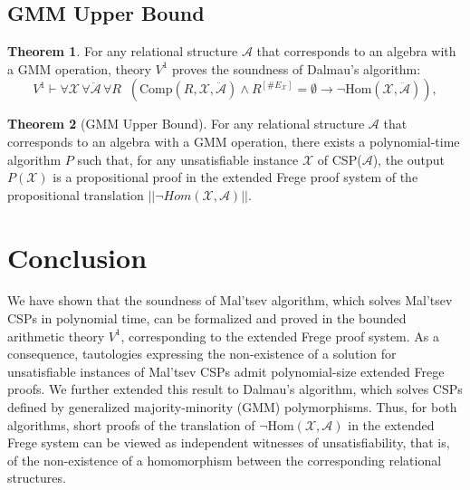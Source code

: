 \documentclass{article}
\theoremstyle{definition}
\theoremstyle{theorem}
\newtheorem{thm}{Theorem}
\theoremstyle{theorem}
\theoremstyle{remark}
\theoremstyle{remark}
\theoremstyle{example}
\theoremstyle{notation}
\theoremstyle{theorem}
\begin{document}
\subsection{GMM Upper Bound}\label{alskh;alisydf;sdd}

\begin{thm}\label{jkjkajsflageee}
For any relational structure $\mathcal{A}$ that corresponds to an algebra with a GMM operation, theory $V^1$ proves the soundness of Dalmau's algorithm:
\[
V^1 \vdash \forall \mathcal{X} \, \forall \ddot{\mathcal{A}} \, \forall R  \;\; \left( \mathrm{Comp}(R, \mathcal{X}, \ddot{\mathcal{A}}) \wedge R^{[\#E_{\mathcal{X}}]} = \emptyset \longrightarrow \neg \mathrm{Hom}(\mathcal{X}, \ddot{\mathcal{A}}) \right),
\]
\end{thm}

\begin{thm}[GMM Upper Bound]
For any relational structure $\mathcal{A}$ that corresponds to an algebra with a GMM operation, there exists a polynomial-time algorithm $P$ such that, for any unsatisfiable instance $\mathcal{X}$ of CSP($\mathcal{A}$), the output $P(\mathcal{X})$ is a propositional proof in the extended Frege proof system of the propositional translation $||\neg Hom(\mathcal{X}, \mathcal{A})||$.
\end{thm}



















\section{Conclusion}

    We have shown that the soundness of Mal’tsev algorithm, which solves Mal’tsev CSPs in polynomial time, can be formalized and proved in the bounded arithmetic theory $V^1$, corresponding to the extended Frege proof system. As a consequence, tautologies expressing the non-existence of a solution for unsatisfiable instances of Mal’tsev CSPs admit polynomial-size extended Frege proofs. We further extended this result to Dalmau’s algorithm, which solves CSPs defined by generalized majority-minority (GMM) polymorphisms. Thus, for both algorithms, short proofs of the translation of $\neg \mathrm{Hom}(\mathcal{X}, \mathcal{A})$ in the extended Frege system can be viewed as independent witnesses of unsatisfiability, that is, of the non-existence of a homomorphism between the corresponding relational structures.
\end{document}
